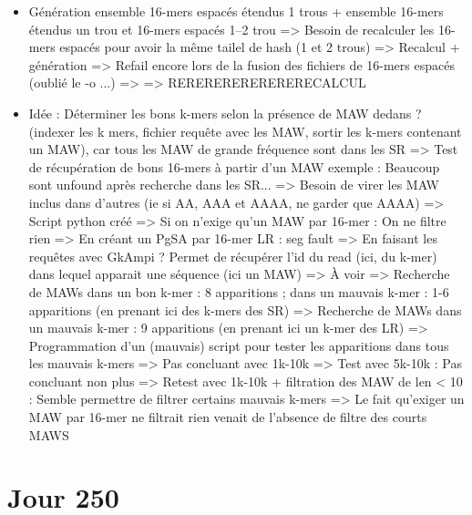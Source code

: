 \documentclass[12pt]{report}
\begin{document}
\begin{itemize}
	\item Génération ensemble 16-mers espacés étendus 1 trous + ensemble 16-mers étendus un trou et 16-mers espacés 1--2 trou
		  => Besoin de recalculer les 16-mers espacés pour avoir la même tailel de hash (1 et 2 trous)
		  => Recalcul + génération
		  => Refail encore lors de la fusion des fichiers de 16-mers espacés (oublié le -o ...) => => RERERERERERERERECALCUL
		  
	\item Idée : Déterminer les bons k-mers selon la présence de MAW dedans ? (indexer les k mers, fichier requête avec
		  les MAW, sortir les k-mers contenant un MAW), car tous les MAW de grande fréquence sont dans les SR
		  => Test de récupération de bons 16-mers à partir d'un MAW exemple : Beaucoup sont unfound après recherche dans les SR...
		  => Besoin de virer les MAW inclus dans d'autres (ie si AA, AAA et AAAA, ne garder que AAAA)
			 => Script python créé
		  => Si on n'exige qu'un MAW par 16-mer : On ne filtre rien
		  => En créant un PgSA par 16-mer LR : seg fault
		  => En faisant les requêtes avec GkAmpi ? Permet de récupérer l'id du read (ici, du k-mer) dans lequel apparait une séquence (ici un MAW)
		  	 => À voir
		  => Recherche de MAWs dans un bon k-mer : 8 apparitions ; dans un mauvais k-mer : 1-6 apparitions (en prenant ici des k-mers des SR)
		  => Recherche de MAWs dans un mauvais k-mer : 9 apparitions (en prenant ici un k-mer des LR)
		  => Programmation d'un (mauvais) script pour tester les apparitions dans tous les mauvais k-mers => Pas concluant avec 1k-10k
		  => Test avec 5k-10k : Pas concluant non plus
		  => Retest avec 1k-10k + filtration des MAW de len < 10 : Semble permettre de filtrer certains mauvais k-mers
			 => Le fait qu'exiger un MAW par 16-mer ne filtrait rien venait de l'absence de filtre des courts MAWS
\end{itemize}

\section{Jour 250}
\end{document}
